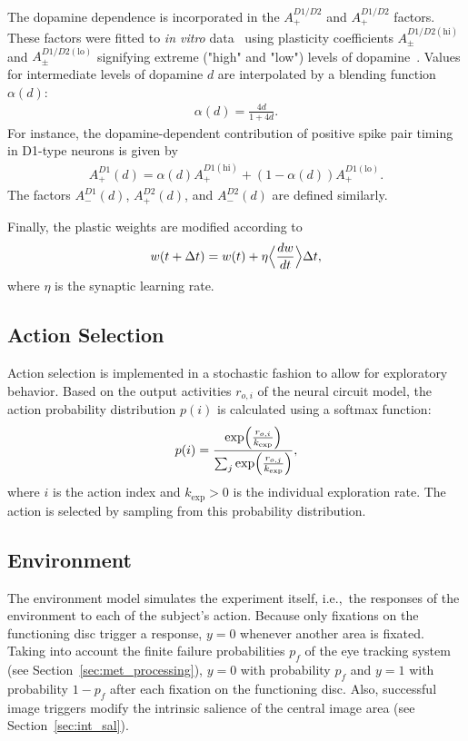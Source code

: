\documentclass[a4paper]{scrreprt}
\begin{document}
The dopamine dependence is incorporated in the $A_+^{D1/D2}$ and $A_+^{D1/D2}$ factors. These factors were fitted to \emph{in vitro} data~\cite{shen08} using plasticity coefficients $A_{\pm}^{D1/D2 (\text{hi})}$ and $A_{\pm}^{D1/D2 (\text{lo})}$ signifying extreme ("high" and "low") levels of dopamine~\cite{gurney09}. Values for intermediate levels of dopamine $d$ are interpolated by a blending function $\alpha(d)$:
\begin{align}
\alpha(d) = \frac{4d}{1+4d}.
\end{align}
For instance, the dopamine-dependent contribution of positive spike pair timing in D1-type neurons is given by
\begin{align}
A_+^{D1}(d) = \alpha(d)A_+^{D1(\text{hi})}+(1-\alpha(d))A_+^{D1(\text{lo})}.
\end{align}
The factors $A_-^{D1}(d)$, $A_+^{D2}(d)$, and $A_-^{D2}(d)$ are defined similarly.

Finally, the plastic weights are modified according to
\begin{align}
w(t+\Delta t) = w(t) + \eta \Bigl\langle \frac{dw}{dt} \Bigr\rangle \Delta t,
\end{align}
where $\eta$ is the synaptic learning rate.



\subsection{Action Selection}

Action selection is implemented in a stochastic fashion to allow for exploratory behavior. Based on the output activities $r_{o,i}$ of the neural circuit model, the action probability distribution $p(i)$ is calculated using a softmax function:
\begin{align}
p(i) = \frac{\exp\Bigl(\frac{r_{o,i}}{k_{\text{exp}}}\Bigr)}{\sum_j \exp\Bigl(\frac{r_{o,j}}{k_{\text{exp}}}\Bigr)},
\end{align}
where $i$ is the action index and $k_{\text{exp}}>0$ is the individual exploration rate. The action is selected by sampling from this probability distribution.


\subsection{Environment}

The environment model simulates the experiment itself, i.e.,~the responses of the environment to each of the subject's action. Because only fixations on the functioning disc trigger a response, $y=0$ whenever another area is fixated. Taking into account the finite failure probabilities $p_f$ of the eye tracking system (see Section~\ref{sec:met_processing}), $y=0$ with probability $p_f$ and $y=1$ with probability $1-p_f$ after each fixation on the functioning disc. Also, successful image triggers modify the intrinsic salience of the central image area (see Section~\ref{sec:int_sal}).
\end{document}
